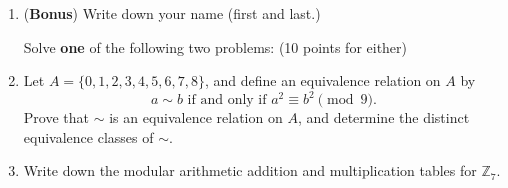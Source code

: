 \documentclass[12pt]{article}
\newcommand{\points}[1]{\marginpar{\hspace{24pt}[#1]}}
\newcommand{\Z}{\mathbb{Z}}
\begin{document}
\thispagestyle{fancy}

\bigskip


\begin{enumerate}
 \item ({\bf Bonus}) Write down your name (first and last.) \points{1}

\vspace{48pt}

Solve {\bf one} of the following two problems: (10 points for either)

 \item Let $A=\{0,1,2,3,4,5,6,7,8\}$, and define an equivalence relation on $A$ by\points{10}
\[
 a\sim b \text{ if and only if } a^2\equiv b^2\pmod{9}.
\]
 Prove that $\sim$ is an equivalence relation on $A$, and determine the distinct equivalence classes of $\sim$.

 \item Write down the modular arithmetic addition and multiplication tables for $\Z_7$.\points{10}

\end{enumerate}
\end{document}
